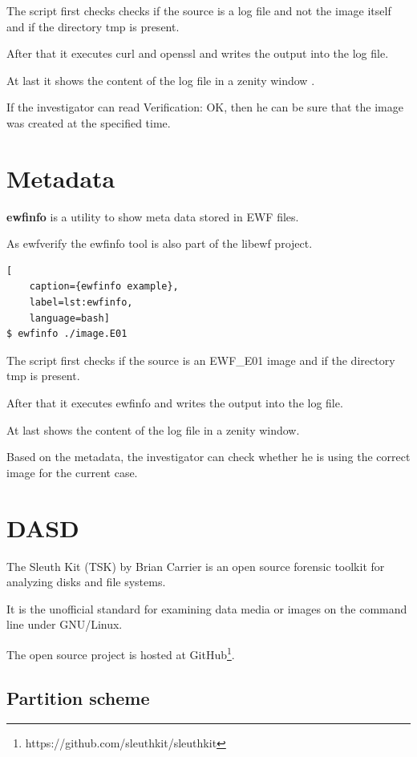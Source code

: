 The script first checks checks if the source is a log file and not the image itself and if the directory tmp is present.

After that it executes curl and openssl and writes the output into the log file.

At last it shows the content of the log file in a zenity window .

If the investigator can read \glqq{}Verification: OK\grqq{}, then he can be sure that the image was created at the specified time.

\section{Metadata}

\textbf{ewfinfo} is a utility to show meta data stored in EWF files.

As ewfverify the ewfinfo tool is also part of the libewf project.

\begin{lstlisting}[
    caption={ewfinfo example},
    label=lst:ewfinfo,
    language=bash]
$ ewfinfo ./image.E01
\end{lstlisting}

The script first  checks if the source is an EWF\_E01 image and if the directory tmp is present.

After that it executes ewfinfo and writes the output into the log file.

At last shows the content of the log file in a zenity window.

Based on the metadata, the investigator can check whether he is using the correct image for the current case.

\section{DASD}
\label{sec:implementation-dasd}

The Sleuth Kit (TSK) by Brian Carrier is an open source forensic toolkit for analyzing disks and file systems. \cite{Carrier2005:15}

It is the unofficial standard for examining data media or images on the command line under GNU/Linux.

The open source project is hosted at GitHub\footnote{https://github.com/sleuthkit/sleuthkit}.

\subsection{Partition scheme}

